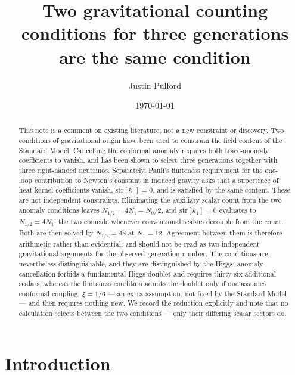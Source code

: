 \documentclass[aps,prd,twocolumn,superscriptaddress,nofootinbib,10pt]{revtex4-2}
\begin{document}
\title{Two gravitational counting conditions for three generations\\
are the same condition}

\author{Justin Pulford}

\date{\today}

\begin{abstract}
This note is a comment on existing literature, not a new constraint or discovery. Two conditions
of gravitational origin have been used to constrain the field content of the Standard Model.
Cancelling the conformal anomaly requires both trace-anomaly coefficients to vanish, and has been
shown to select three generations together with three right-handed neutrinos. Separately, Pauli's
finiteness requirement for the one-loop contribution to Newton's constant in induced gravity asks
that a supertrace of heat-kernel coefficients vanish, $\mathrm{str}[k_1] = 0$, and is satisfied by
the same content. These are not independent constraints. Eliminating the auxiliary scalar count
from the two anomaly conditions leaves $N_{1/2} = 4N_1 - N_0/2$, and $\mathrm{str}[k_1] = 0$
evaluates to $N_{1/2} = 4N_1$; the two coincide whenever conventional scalars decouple from the
count. Both are then solved by $N_{1/2} = 48$ at $N_1 = 12$. Agreement between them is therefore
arithmetic rather than evidential, and should not be read as two independent gravitational
arguments for the observed generation number. The conditions are nevertheless distinguishable,
and they are distinguished by the Higgs: anomaly cancellation forbids a fundamental Higgs doublet
and requires thirty-six additional scalars, whereas the finiteness condition admits the doublet
only if one assumes conformal coupling, $\xi = 1/6$ --- an extra assumption, not fixed by the
Standard Model --- and then requires nothing new. We record the reduction explicitly and note that
no calculation selects between the two conditions --- only their differing scalar sectors do.
\end{abstract}

\maketitle

\section{Introduction}\label{sec:intro}
\end{document}
